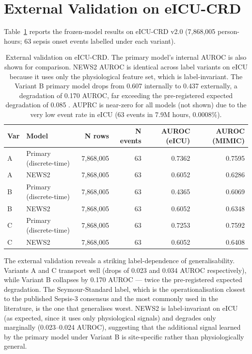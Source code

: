 \section{External Validation on eICU-CRD}
\label{sec:external}

Table~\ref{tab:external} reports the frozen-model results on eICU-CRD v2.0
(7{,}868{,}005 person-hours; 63 sepsis onset events labelled under each variant).

\begin{table}[H]
  \centering
  \begin{tabular}{llrrrr}
    \toprule
    \textbf{Var} & \textbf{Model} & \textbf{N rows} & \textbf{N events}
      & \textbf{AUROC (eICU)} & \textbf{AUROC (MIMIC)} \\
    \midrule
    A & Primary (discrete-time) & 7{,}868{,}005 & 63 & 0.7362 & 0.7595 \\
    A & NEWS2                   & 7{,}868{,}005 & 63 & 0.6052 & 0.6286 \\
    \midrule
    B & Primary (discrete-time) & 7{,}868{,}005 & 63 & 0.4365 & 0.6069 \\
    B & NEWS2                   & 7{,}868{,}005 & 63 & 0.6052 & 0.6348 \\
    \midrule
    C & Primary (discrete-time) & 7{,}868{,}005 & 63 & 0.7253 & 0.7592 \\
    C & NEWS2                   & 7{,}868{,}005 & 63 & 0.6052 & 0.6408 \\
    \bottomrule
  \end{tabular}
  \caption{External validation on eICU-CRD. The primary model's internal AUROC is
  also shown for comparison. NEWS2 AUROC is identical across label variants on
  eICU because it uses only the physiological feature set, which is label-invariant.
  The Variant B primary model drops from 0.607 internally to 0.437 externally,
  a degradation of 0.170 AUROC, far exceeding the pre-registered expected
  degradation of 0.085 \parencite{moor2023review}. AUPRC is near-zero for all
  models (not shown) due to the very low event rate in eICU (63 events in 7.9M
  hours, 0.0008\%).}
  \label{tab:external}
\end{table}

The external validation reveals a striking label-dependence of generalisability.
Variants A and C transport well (drops of 0.023 and 0.034 AUROC respectively),
while Variant B collapses by 0.170 AUROC --- twice the pre-registered expected
degradation. The Seymour-Standard label, which is the operationalisation closest
to the published Sepsis-3 consensus and the most commonly used in the literature,
is the one that generalises worst. NEWS2 is label-invariant on eICU (as expected,
since it uses only physiological signals) and degrades only marginally (0.023--0.024
AUROC), suggesting that the additional signal learned by the primary model under
Variant B is site-specific rather than physiologically general.

